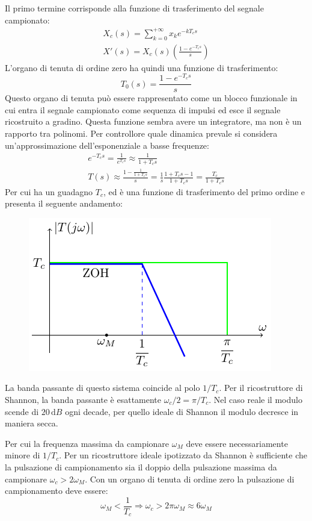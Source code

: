 \documentclass{article}
\numberwithin{equation}{subsection}
\newcommand{\df}{\mathrm{d}}
\begin{document}
Il primo termine corrisponde alla funzione di trasferimento del segnale campionato:
\begin{gather*}
    X_c(s)=\sum_{k=0}^{+\infty}x_ke^{-kT_cs}\\
    X'(s)=X_c(s)\left(\displaystyle\frac{1-e^{-T_cs}}{s}\right)
\end{gather*}
L'organo di tenuta di ordine zero ha quindi una funzione di trasferimento: 
\begin{equation}
    T_0(s)=\displaystyle\frac{1-e^{-T_cs}}{s}
\end{equation}
Questo organo di tenuta può essere rappresentato come un blocco funzionale in cui entra il segnale campionato come sequenza di impulsi ed esce il segnale ricostruito a gradino. 
Questa funzione sembra avere un integratore, ma non è un rapporto tra polinomi. Per controllore quale dinamica prevale si considera un'approssimazione dell'esponenziale a 
basse frequenze: 
\begin{gather*}
    e^{-T_cs}=\displaystyle\frac{1}{e^{T_cs}}\approx\frac{1}{1+T_cs}\\
    T(s)\approx\displaystyle\frac{1-\displaystyle\frac{1}{1+T_cs}}{s}=\frac{1}{s}\frac{1+T_cs-1}{1+T_cs}=\frac{T_c}{1+T_cs}
\end{gather*}
Per cui ha un guadagno $T_c$, ed è una funzione di trasferimento del primo ordine e presenta il seguente andamento:
\begin{figure}[H]%
    \centering
    \includegraphics{trasformata-tenuta-0.pdf}%
\end{figure}
La banda passante di questo sistema coincide al polo $1/T_c$. Per il ricostruttore di Shannon, la banda passante è esattamente 
${\omega_c}/{2}={\pi}/{T_c}$. Nel caso reale il modulo scende di $20\,\df B$ ogni decade, per quello ideale di Shannon il modulo decresce in maniera secca. 


Per cui la frequenza massima da campionare $\omega_M$ deve essere necessariamente minore di $1/T_c$. Per un ricostruttore ideale ipotizzato da Shannon 
è sufficiente che la pulsazione di campionamento sia il doppio della pulsazione massima da campionare $\omega_c>2\omega_M$. Con un organo di tenuta di ordine zero la 
pulsazione di campionamento deve essere: 
\begin{equation}
    \displaystyle \omega_M<\frac{1}{T_c}\Rightarrow \omega_c>2\pi\omega_M\approx6\omega_M
\end{equation}
\end{document}
